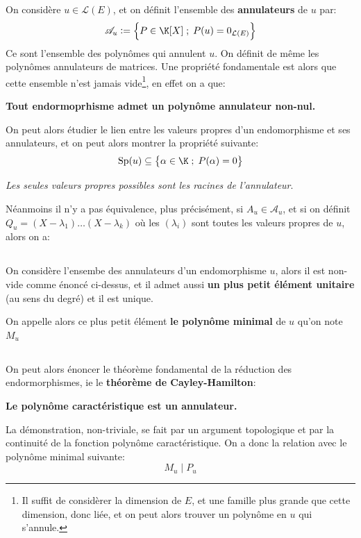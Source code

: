 \subsection*{}
On considère \(u \in \mathcal{L}(E)\), et on définit l'ensemble des \textbf{annulateurs} de \(u\) par:
\[
   \mathscr{A}_u := \Bigl\{ P \in \K[X] \; ; \; P(u) = 0_{\mathcal{L}(E)} \Bigl\}   
\]
Ce sont l'ensemble des polynômes qui annulent \(u\). On définit de même les polynômes annulateurs de matrices. Une propriété fondamentale est alors que cette ensemble n'est jamais vide\footnote[1]{Il suffit de considèrer la dimension de \(E\), et une famille plus grande que cette dimension, donc liée, et on peut alors trouver un polynôme en \(u\) qui s'annule.}, en effet on a que:
\begin{center}
   \textbf{Tout endormoprhisme admet un polynôme annulateur non-nul.}
\end{center}
On peut alors étudier le lien entre les valeurs propres d'un endomorphisme et ses annulateurs, et on peut alors montrer la propriété suivante:
\[
   \text{Sp}(u) \subseteq \bigl\{ \alpha \in \K \; ; \; P(\alpha) = 0 \bigl\}   
\]
\begin{center}
   \textit{Les seules valeurs propres possibles sont les racines de l'annulateur}.
\end{center}
\pagebreak
Néanmoins il n'y a pas équivalence, plus précisément, si \(A_u \in \mathscr{A}_u\), et si on définit \(Q_u = (X - \lambda_1)\ldots(X - \lambda_k)\) où les \((\lambda_i)\) sont toutes les valeurs propres de \(u\), alors on a:
\subsection*{}
On considère l'ensembe des annulateurs d'un endomorphisme \(u\), alors il est non-vide comme énoncé ci-dessus, et il admet aussi \textbf{un plus petit élément unitaire} (au sens du degré) et il est unique.\<

On appelle alors ce plus petit élément \textbf{le polynôme minimal} de \(u\) qu'on note \(M_u\)
\subsection*{}
On peut alors énoncer le théorème fondamental de la réduction des endormorphismes, ie le \textbf{théorème de Cayley-Hamilton}:
\begin{center}
   \textbf{Le polynôme caractéristique est un annulateur.}
\end{center}
La démonstration, non-triviale, se fait par un argument topologique et par la continuité de la fonction polynôme caractéristique. On a donc la relation avec le polynôme minimal suivante:
\[
   M_u \; | \; P_u   
\]
